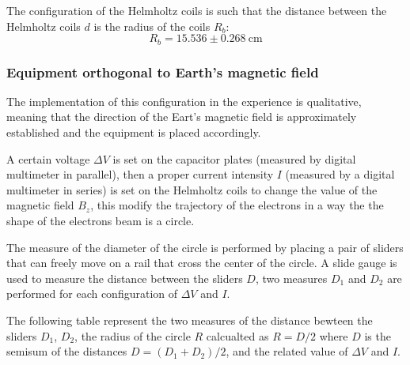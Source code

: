 The configuration of the Helmholtz coils is such that the distance between the Helmholtz coils $d$ is 
the radius of the coils $R_b$:
\[
    R_b=15.536 \pm 0.268 \ \text{cm}
\]

\subsubsection{Equipment orthogonal to Earth's magnetic field}
The implementation of this configuration in the experience is qualitative, 
meaning that the direction of the Eart's magnetic field is approximately established 
and the equipment is placed accordingly.

A certain voltage $\Delta V$ is set on the capacitor plates (measured by digital multimeter in parallel), then a proper current intensity $I$ (measured by a digital multimeter in series)
is set on the Helmholtz coils to change the value of the magnetic field $B_z$, this modify 
the trajectory of the electrons in a way the the shape of the electrons beam is a circle.

The measure of the diameter of the circle is performed by placing a pair of sliders that can freely move 
on a rail that cross the center of the circle.
A slide gauge is used to measure the distance between the sliders $D$, two measures $D_1$ and $D_2$ are performed for each configuration of $\Delta V$ and $I$.

The following table represent the two measures of the distance bewteen the sliders $D_1$, $D_2$, the radius of the circle $R$ calcualted as $R=D/2$ where $D$ is the semisum of the distances $D=(D_1 + D_2)/2$, and the related value of $\Delta V$ and $I$. 

